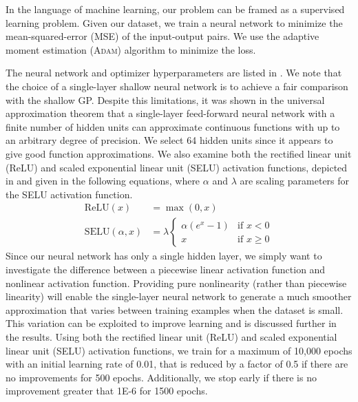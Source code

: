 \documentclass[conference]{IEEEtran}
\begin{document}
	In the language of machine learning, our problem can be framed as a supervised learning problem. Given our dataset, we train a neural network to minimize the mean-squared-error (MSE) of the input-output pairs. We use the adaptive moment estimation (\textsc{Adam}) algorithm to minimize the loss. 
	
	The neural network and optimizer hyperparameters are listed in . We note that the choice of a single-layer shallow neural network is to achieve a fair comparison with the shallow GP. Despite this limitations, it was shown in the universal approximation theorem \cite{Cybenko1989ApproximationFunction} that a single-layer feed-forward neural network with a finite number of hidden units can approximate continuous functions with up to an arbitrary degree of precision. We select 64 hidden units since it appears to give good function approximations. We also examine both the rectified linear unit (ReLU) \cite{Nair2010RectifiedMachines} and scaled exponential linear unit (SELU) \cite{Klambauer2017Self-normalizingNetworks} activation functions, depicted in  and given in the following equations, where $\alpha$ and $\lambda$ are scaling parameters for the SELU activation function.
	\begin{align*}
	    \text{ReLU}(x) &= \max(0, x) \\
	    \text{SELU}(\alpha, x) &= \lambda 
	        \begin{cases}
                \alpha (e^x - 1) & \text{if $x < 0$} \\
                x & \text{if $x \ge 0$}
            \end{cases}   
	\end{align*}
	Since our neural network has only a single hidden layer, we simply want to investigate the difference between a piecewise linear activation function and nonlinear activation function. Providing pure nonlinearity (rather than piecewise linearity) will enable the single-layer neural network to generate a much smoother approximation that varies between training examples when the dataset is small. This variation can be exploited to improve learning and is discussed further in the results. Using both the rectified linear unit (ReLU) and scaled exponential linear unit (SELU) activation functions, we train for a maximum of 10,000 epochs with an initial learning rate of 0.01, that is reduced by a factor of 0.5 if there are no improvements for 500 epochs. Additionally, we stop early if there is no improvement greater that 1E-6 for 1500 epochs.
	
\end{document}
